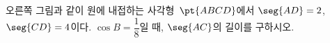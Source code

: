 \noindent\begin{minipage}[t]{0.58\linewidth}\vspace{0pt}\raggedright 오른쪽 그림과 같이 원에 내접하는 사각형~$\pt{ABCD}$에서 $\seg{AD}=2$, $\seg{CD}=4$이다. $\cos B=\dfrac{1}{8}$일 때, $\seg{AC}$의 길이를 구하시오.\end{minipage}\hfill\begin{minipage}[t]{0.4\linewidth}\vspace{0pt}\centering \resizebox{\ifdim\width>\linewidth\linewidth\else\width\fi}{!}{}\end{minipage}\par
